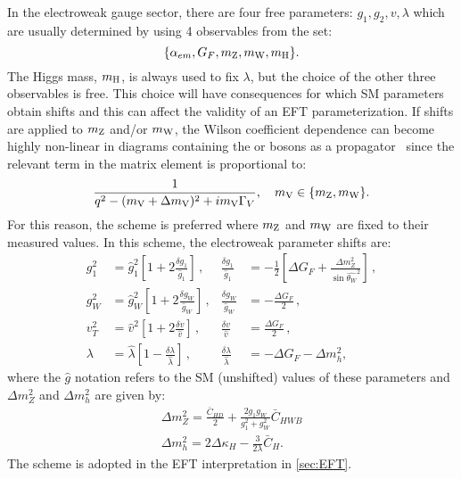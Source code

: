 In the electroweak gauge sector, there are four free parameters: $g_1, g_2, v, \lambda$ which are usually determined by using 4 observables from the set:
\begin{equation}
  \{\alpha_{em}, G_F, m_\mathrm{Z}, m_\mathrm{W}, m_\mathrm{H}\} .
\end{equation}
The Higgs mass, $m_\mathrm{H}$, is always used to fix $\lambda$, but the choice of the other three observables is free. This choice will have consequences for which SM parameters obtain shifts and this can affect the validity of an EFT parameterization. If shifts are applied to $m_\mathrm{Z}$ and/or $m_\mathrm{W}$, the Wilson coefficient dependence can become highly non-linear in diagrams containing the \PZ or \PW bosons as a propagator~\cite{Brivio:2021yjb} since the relevant term in the matrix element is proportional to:
\begin{equation}
  \frac{1}{q^2 - (m_\mathrm{V} + \Delta m_\mathrm{V})^2 + i m_\mathrm{V} \Gamma_V},\quad m_\mathrm{V} \in \{m_\mathrm{Z}, m_\mathrm{W}\} .
  \label{eq:propagator_term}
\end{equation}
For this reason, the \mWinput scheme is preferred where $m_\mathrm{Z}$ and $m_\mathrm{W}$ are fixed to their measured values. In this scheme, the electroweak parameter shifts are:
\begin{align}
  g_1^2 &= \hat g_1^2 \left[1+2\frac{\delta g_1}{\hat g_1}\right]\,,
  &
  \frac{\delta g_1}{\hat g_1}
  &=
   -\frac 12\left[\Delta G_F + \frac{\Delta m_Z^2}{\sin{\hat{\theta_W}}^2}\right]\,,
  \\
  g_W^2 &= \hat g_W^2\left[1+2\frac{\delta g_W}{\hat g_W}\right]\,,
  &
  \frac{\delta g_W}{\hat g_W}
  &=
  - \frac{\Delta G_F}{2}\,,
  \\
  v_T^2 &= \hat v^2\left[1+2\frac{\delta v}{\hat v}\right]\,,
  &
  \frac{\delta v}{\hat v}
  &=
  \frac{\Delta G_F}{2}\,,
  \\
  \lambda &= \hat\lambda\left[1-\frac{\delta \lambda}{\hat \lambda}\right]\,,
  &
  \frac{\delta \lambda}{\hat \lambda}
  &=
  -\Delta G_F-\Delta m_h^2,
\end{align}
where the $\hat{g}$ notation refers to the SM (unshifted) values of these parameters and $\Delta m_Z^2$ and $\Delta m_h^2$ are given by:
\begin{gather}
  \Delta m_Z^2 = \frac{\bar{C}_{HD}}{2} + \frac{2g_1 g_W}{g_1^2 + g_W^2}\bar{C}_{HWB} \\
  \Delta m_h^2 = 2 \Delta \kappa_H - \frac{3}{2\lambda}\bar{C}_H .
\end{gather}
The \mWinput scheme is adopted in the EFT interpretation in \cref{sec:EFT}.

